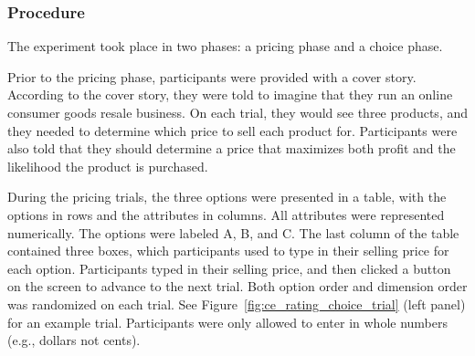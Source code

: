 \subsubsection{Procedure}

The experiment took place in two phases: a pricing phase and a choice phase.

Prior to the pricing phase, participants were provided with a cover story. According to the cover story, they were told to imagine that they run an online consumer goods resale business. On each trial, they would see three products, and they needed to determine which price to sell each product for. Participants were also told that they should determine a price that maximizes both profit and the likelihood the product is purchased. 

During the pricing trials, the three options were presented in a table, with the options in rows and the attributes in columns. All attributes were represented numerically. The options were labeled A, B, and C. The last column of the table contained three boxes, which participants used to type in their selling price for each option. Participants typed in their selling price, and then clicked a button on the screen to advance to the next trial. Both option order and dimension order was randomized on each trial. See Figure~\ref{fig:ce_rating_choice_trial} (left panel) for an example trial. Participants were only allowed to enter in whole numbers (e.g., dollars not cents).

